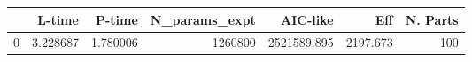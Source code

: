 \begin{tabular}{lrrrrrr}
\toprule
{} &    L-time &    P-time &  N\_params\_expt &     AIC-like &       Eff &  N. Parts \\
\midrule
0 &  3.228687 &  1.780006 &        1260800 &  2521589.895 &  2197.673 &       100 \\
\bottomrule
\end{tabular}
